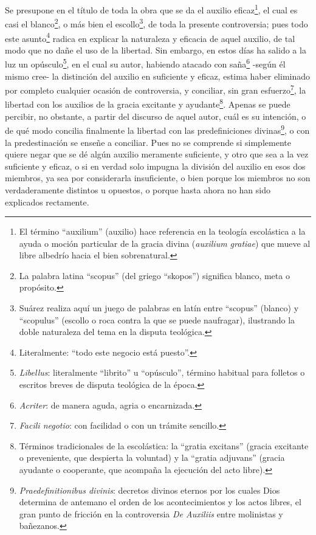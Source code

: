 \documentclass{article}
\begin{document}
Se presupone en el título de toda la obra que se da el auxilio eficaz\footnote{El
término \enquote{auxilium} (auxilio) hace referencia en la teología escolástica a la
ayuda o moción particular de la gracia divina (\textit{auxilium gratiae}) que mueve al
libre albedrío hacia el bien sobrenatural.}, el cual es casi el blanco\footnote{La
palabra latina \enquote{scopus} (del griego \enquote{skopos}) significa blanco, meta o
propósito.}, o más bien el escollo\footnote{Suárez realiza aquí un juego de palabras en
latín entre \enquote{scopus} (blanco) y \enquote{scopulus} (escollo o roca contra la que
se puede naufragar), ilustrando la doble naturaleza del tema en la disputa teológica.},
de toda la presente controversia; pues todo este asunto\footnote{Literalmente:
\enquote{todo este negocio está puesto}.} radica en explicar la naturaleza y eficacia de
aquel auxilio, de tal modo que no dañe el uso de la libertad. Sin embargo, en estos días
ha salido a la luz un opúsculo\footnote{\textit{Libellus}: literalmente
\enquote{librito} u \enquote{opúsculo}, término habitual para folletos o escritos breves
de disputa teológica de la época.}, en el cual su autor, habiendo atacado con
saña\footnote{\textit{Acriter}: de manera aguda, agria o encarnizada.} -según él mismo
cree- la distinción del auxilio en suficiente y eficaz, estima haber eliminado por
completo cualquier ocasión de controversia, y conciliar, sin gran
esfuerzo\footnote{\textit{Facili negotio}: con facilidad o con un trámite sencillo.}, la
libertad con los auxilios de la gracia excitante y ayudante\footnote{Términos
tradicionales de la escolástica: la \enquote{gratia excitans} (gracia excitante o
preveniente, que despierta la voluntad) y la \enquote{gratia adjuvans} (gracia ayudante
o cooperante, que acompaña la ejecución del acto libre).}. Apenas se puede percibir, no
obstante, a partir del discurso de aquel autor, cuál es su intención, o de qué modo
concilia finalmente la libertad con las predefiniciones
divinas\footnote{\textit{Praedefinitionibus divinis}: decretos divinos eternos por los
cuales Dios determina de antemano el orden de los acontecimientos y los actos libres, el
gran punto de fricción en la controversia \textit{De Auxiliis} entre molinistas y
bañezanos.}, o con la predestinación se enseñe a conciliar. Pues no se comprende si
simplemente quiere negar que se dé algún auxilio meramente suficiente, y otro que sea a
la vez suficiente y eficaz, o si en verdad solo impugna la división del auxilio en esos
dos miembros, ya sea por considerarla insuficiente, o bien porque los miembros no son
verdaderamente distintos u opuestos, o porque hasta ahora no han sido explicados
rectamente.
\end{document}
